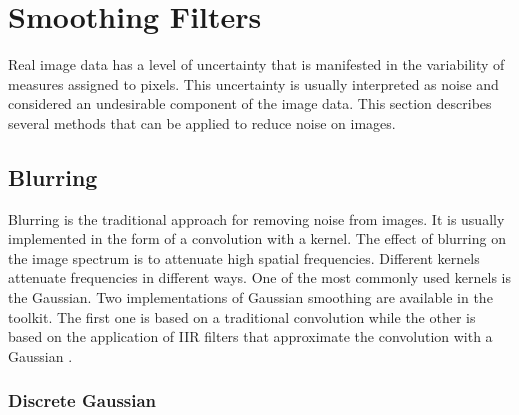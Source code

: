 




\section{Smoothing Filters}
\label{sec:SmoothingFilters}

Real image data has a level of uncertainty that is manifested in the
variability of measures assigned to pixels. This uncertainty is usually
interpreted as noise and considered an undesirable component of the image
data. This section describes several methods that can be applied to reduce
noise on images.

\subsection{Blurring}
\label{sec:BlurringFilters}

Blurring is the traditional approach for removing noise from images. It is
usually implemented in the form of a convolution with a kernel. The effect of
blurring on the image spectrum is to attenuate high spatial
frequencies.  Different kernels attenuate frequencies in different ways. One
of the most commonly used kernels is the Gaussian. Two implementations of
Gaussian smoothing are available in the toolkit. The first one is based on a
traditional convolution while the other is based on the application of IIR
filters that approximate the convolution with a Gaussian
\cite{Deriche1990,Deriche1993}.

\subsubsection{Discrete Gaussian}
\label{sec:DiscreteGaussianImageFilter}

\ifitkFullVersion

\fi


